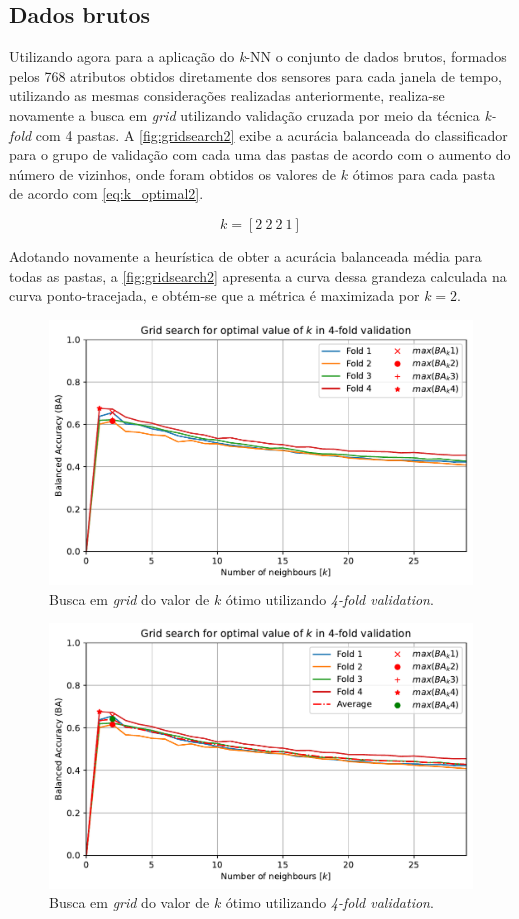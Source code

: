 \subsection{Dados brutos}

Utilizando agora para a aplicação do \textit{k}-NN o conjunto de dados brutos, formados pelos 768 atributos obtidos diretamente dos sensores para cada janela de tempo, utilizando as mesmas considerações realizadas anteriormente, realiza-se novamente a busca em \textit{grid} utilizando validação cruzada por meio da técnica \textit{k-fold} com 4 pastas. A \autoref{fig:gridsearch2} exibe a acurácia balanceada do classificador para o grupo de validação com cada uma das pastas de acordo com o aumento do número de vizinhos, onde foram obtidos os valores de $k$ ótimos para cada pasta de acordo com \eqref{eq:k_optimal2}.

\begin{equation}\label{eq:k_optimal2}
	k = [2\ 2\ 2\ 1]
\end{equation}

Adotando novamente a heurística de obter a acurácia balanceada média para todas as pastas, a \autoref{fig:gridsearch2} apresenta a curva dessa grandeza calculada na curva ponto-tracejada, e obtém-se que a métrica é maximizada por $k = 2$.


\begin{figure}[H]
	\centering
	\includegraphics[width=0.75\linewidth]{../../plot/knn_2/grid_search_k_fold}
	\caption{Busca em \textit{grid} do valor de $k$ ótimo utilizando \textit{4-fold validation}.}
	\label{fig:gridsearch2}
\end{figure}

\begin{figure}[H]
	\centering
	\includegraphics[width=0.75\linewidth]{../../plot/knn_2/grid_search_k_fold-k_optimal}
	\caption{Busca em \textit{grid} do valor de $k$ ótimo utilizando \textit{4-fold validation}.}
	\label{fig:gridsearch-k_optimal2}
\end{figure}

